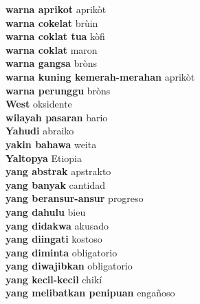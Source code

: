 \textbf{ warna aprikot  } aprikòt \\
\textbf{ warna cokelat  } brùin \\
\textbf{ warna coklat tua  } kòfi \\
\textbf{ warna coklat  } maron \\
\textbf{ warna gangsa  } bròns \\
\textbf{ warna kuning kemerah-merahan  } aprikòt \\
\textbf{ warna perunggu  } bròns \\
\textbf{ West  } oksidente \\
\textbf{ wilayah pasaran  } bario \\
\textbf{ Yahudi  } abraiko \\
\textbf{ yakin bahawa  } weita \\
\textbf{ Yaltopya  } Etiopia \\
\textbf{ yang abstrak  } apstrakto \\
\textbf{ yang banyak  } cantidad \\
\textbf{ yang beransur-ansur  } progreso \\
\textbf{ yang dahulu  } bieu \\
\textbf{ yang didakwa  } akusado \\
\textbf{ yang diingati  } kostoso \\
\textbf{ yang diminta  } obligatorio \\
\textbf{ yang diwajibkan  } obligatorio \\
\textbf{ yang kecil-kecil  } chikí \\
\textbf{ yang melibatkan penipuan  } engañoso \\
